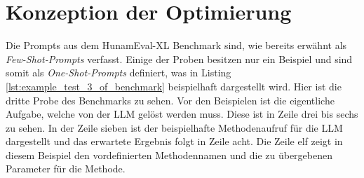 \section{Konzeption der Optimierung}\label{sec:conzept_of_optimization_prompt}
Die Prompts aus dem HunamEval-XL Benchmark sind, wie bereits erwähnt als  \textit{Few-Shot-Prompts} verfasst. Einige der Proben besitzen nur ein Beispiel und sind somit als \textit{One-Shot-Prompts} definiert, was in Listing \ref{lst:example_test_3_of_benchmark} beispielhaft dargestellt wird. Hier ist die dritte Probe des Benchmarks zu sehen. Vor den Beispielen ist die eigentliche Aufgabe, welche von der LLM gelöst werden muss. Diese ist in Zeile drei bis sechs zu sehen. In der Zeile sieben ist der beispielhafte Methodenaufruf für die LLM dargestellt und das erwartete Ergebnis folgt in Zeile acht. Die Zeile elf zeigt in diesem Beispiel den vordefinierten Methodennamen und die zu übergebenen Parameter für die Methode.\vspace{0.2cm}

